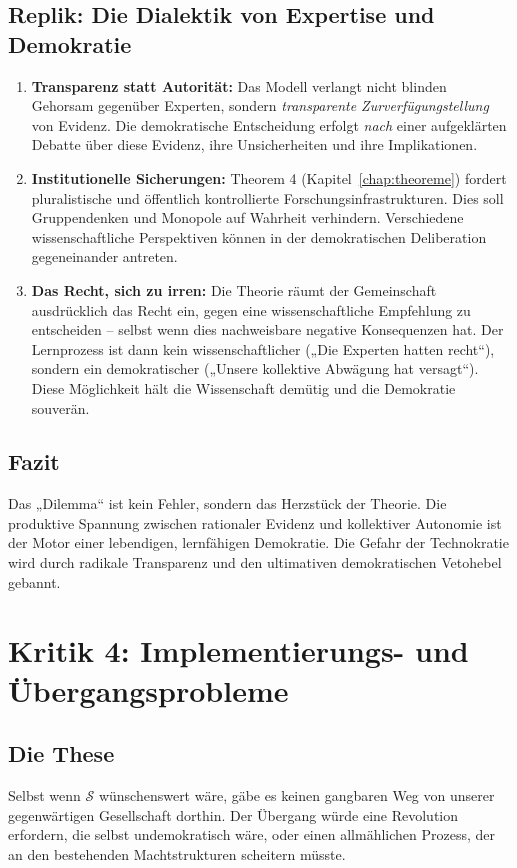 \subsection{Replik: Die Dialektik von Expertise und Demokratie}
\begin{enumerate}
    \item \textbf{Transparenz statt Autorität:} Das Modell verlangt nicht blinden Gehorsam gegenüber Experten, sondern \emph{transparente Zurverfügungstellung} von Evidenz. Die demokratische Entscheidung erfolgt \emph{nach} einer aufgeklärten Debatte über diese Evidenz, ihre Unsicherheiten und ihre Implikationen.
    \item \textbf{Institutionelle Sicherungen:} Theorem 4 (Kapitel~\ref{chap:theoreme}) fordert pluralistische und öffentlich kontrollierte Forschungsinfrastrukturen. Dies soll Gruppendenken und Monopole auf Wahrheit verhindern. Verschiedene wissenschaftliche Perspektiven können in der demokratischen Deliberation gegeneinander antreten.
    \item \textbf{Das Recht, sich zu irren:} Die Theorie räumt der Gemeinschaft ausdrücklich das Recht ein, gegen eine wissenschaftliche Empfehlung zu entscheiden – selbst wenn dies nachweisbare negative Konsequenzen hat. Der Lernprozess ist dann kein wissenschaftlicher („Die Experten hatten recht“), sondern ein demokratischer („Unsere kollektive Abwägung hat versagt“). Diese Möglichkeit hält die Wissenschaft demütig und die Demokratie souverän.
\end{enumerate}

\subsection{Fazit}
Das „Dilemma“ ist kein Fehler, sondern das Herzstück der Theorie. Die produktive Spannung zwischen rationaler Evidenz und kollektiver Autonomie ist der Motor einer lebendigen, lernfähigen Demokratie. Die Gefahr der Technokratie wird durch radikale Transparenz und den ultimativen demokratischen Vetohebel gebannt.

\section{Kritik 4: Implementierungs- und Übergangsprobleme}

\subsection{Die These}
Selbst wenn $\mathcal{S}$ wünschenswert wäre, gäbe es keinen gangbaren Weg von unserer gegenwärtigen Gesellschaft dorthin. Der Übergang würde eine Revolution erfordern, die selbst undemokratisch wäre, oder einen allmählichen Prozess, der an den bestehenden Machtstrukturen scheitern müsste.

